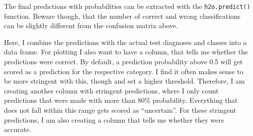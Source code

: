 \documentclass[]{book}
\begin{document}
The final predictions with probabilities can be extracted with the \texttt{h2o.predict()} function. Beware though, that the number of correct and wrong classifications can be slightly different from the confusion matrix above.

Here, I combine the predictions with the actual test diagnoses and classes into a data frame. For plotting I also want to have a column, that tells me whether the predictions were correct. By default, a prediction probability above 0.5 will get scored as a prediction for the respective category. I find it often makes sense to be more stringent with this, though and set a higher threshold. Therefore, I am creating another column with stringent predictions, where I only count predictions that were made with more than 80\% probability. Everything that does not fall within this range gets scored as ``uncertain''. For these stringent predictions, I am also creating a column that tells me whether they were accurate.
\end{document}
